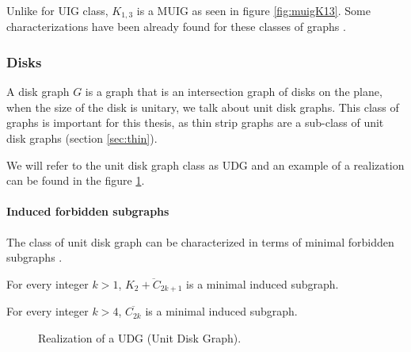 Unlike for UIG class, $K_{1,3}$ is a MUIG as seen in figure \ref{fig:muigK13}. Some
characterizations have been already found for these classes of graphs \cite{shuchatUnitMixedInterval2014}
\cite{joosCharacterizationMixedUnit2013}.

\subsubsection{Disks}

A disk graph $G$ is a graph that is an intersection graph of disks on the plane, when the size
of the disk is unitary, we talk about unit disk graphs. This class of graphs
is important for this thesis, as thin strip graphs are a sub-class of
unit disk graphs (section \ref{sec:thin}).

We will refer to the unit disk graph class as UDG and an example of a realization
can be found in the figure \ref{fig:udg}.

\paragraph{Induced forbidden subgraphs} The class of unit disk graph can be
characterized in terms of minimal forbidden subgraphs \cite{atminasForbiddenInducedSubgraphs2016}.

\begin{theorem}
  For every integer $k > 1$, $\overline{K_2 + C_{2k+1}}$ is a minimal induced subgraph.
\end{theorem}

\begin{theorem}
  For every integer $k > 4$, $\overline{C_{2k}}$ is a minimal induced subgraph.
\end{theorem}

\begin{figure}
\centering

\begin{scaletikzpicturetowidth}{\textwidth}
\end{scaletikzpicturetowidth}

\caption{Realization of a UDG (Unit Disk Graph).}
\label{fig:udg}
\end{figure}

